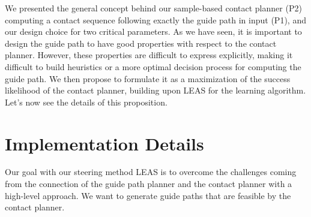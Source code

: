 We presented the general concept behind our sample-based contact planner (P2) computing a contact sequence following exactly the guide path in input (P1), and our design choice for two critical parameters.
As we have seen, it is important to design the guide path to have good properties with respect to the contact planner. 
However, these properties are difficult to express explicitly, making it difficult to build heuristics or a more optimal decision process for computing the guide path. 
We then propose to formulate it as a maximization of the success likelihood of the contact planner, building upon LEAS for the learning algorithm. Let's now see the details of this proposition.


\section{Implementation Details\label{sub:cp-sb:leas_coupling}}

Our goal with our steering method LEAS is to overcome the challenges coming from the connection of the guide path planner and the contact planner with a high-level approach.
We want to generate guide paths that are feasible by the contact planner.


